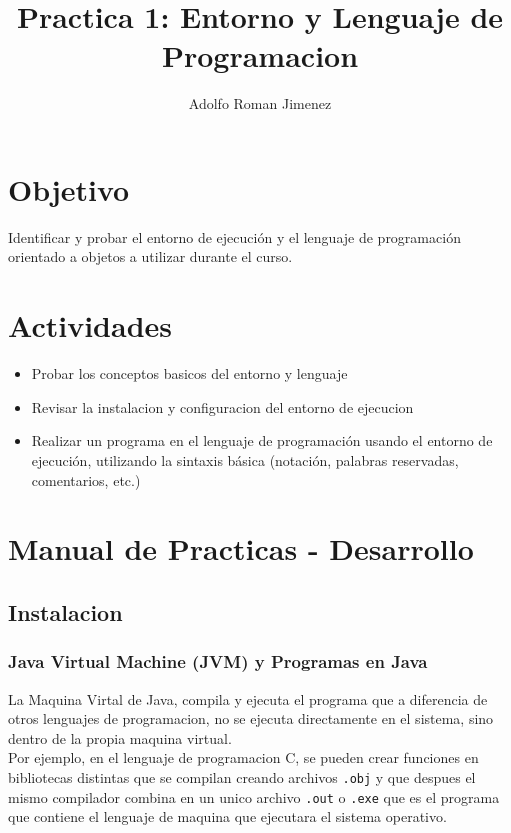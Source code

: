 \documentclass{article}
\title{Practica 1: Entorno y Lenguaje de Programacion}
\author{Adolfo Roman Jimenez}
\begin{document}
	
	\maketitle
	
	\section{Objetivo}
	
	Identificar y probar el entorno de ejecución y el lenguaje de programación orientado a	objetos a utilizar durante el curso.
	
	\section{Actividades}
	
	\begin{itemize}
		\item Probar los conceptos basicos del entorno y lenguaje
		\item Revisar la instalacion y configuracion del entorno de ejecucion
		\item Realizar un programa en el lenguaje de programación usando el entorno de ejecución, utilizando la sintaxis básica (notación, palabras reservadas, comentarios, etc.) 
	\end{itemize}
	\newpage
	
	\section{Manual de Practicas - Desarrollo}
	
	\subsection{Instalacion}
	
		\subsubsection{Java Virtual Machine (JVM) y Programas en Java}
		
		La Maquina Virtal de Java, compila y ejecuta el programa que a diferencia de otros lenguajes de programacion, no se ejecuta directamente en el sistema, sino dentro de la propia maquina virtual.\\
		
		Por ejemplo, en el lenguaje de programacion C, se pueden crear funciones en bibliotecas distintas que se compilan creando archivos \verb*|.obj| y que despues el mismo compilador combina en un unico archivo \verb*|.out| o \verb*|.exe| que es el programa que contiene el lenguaje de maquina que ejecutara el sistema operativo.
		
\end{document}

